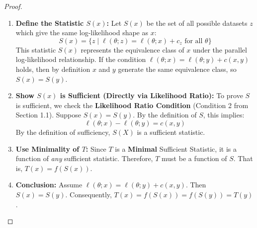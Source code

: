 \documentclass[
  letterpaper,
  DIV=11,
  numbers=noendperiod]{scrreprt}
\renewcommand{\[}{\begin{equation}}
\renewcommand{\]}{\end{equation}}
\theoremstyle{definition}
\theoremstyle{plain}
\theoremstyle{plain}
\theoremstyle{plain}
\theoremstyle{definition}
\theoremstyle{plain}
\theoremstyle{remark}
\begin{document}
\begin{proof}
\begin{enumerate}
\def\labelenumi{\arabic{enumi}.}
\item
  \textbf{Define the Statistic \(S(x)\):} Let \(S(x)\) be the set of all
  possible datasets \(z\) which give the same log-likelihood shape as
  \(x\): \[
  S(x) = \{z \mid \ell(\theta; z) = \ell(\theta; x) + c_z \text{ for all } \theta \}
  \] This statistic \(S(x)\) represents the equivalence class of \(x\)
  under the parallel log-likelihood relationship. If the condition
  \(\ell(\theta; x) = \ell(\theta; y) + c(x, y)\) holds, then by
  definition \(x\) and \(y\) generate the same equivalence class, so
  \(S(x) = S(y)\).
\item
  \textbf{Show \(S(x)\) is Sufficient (Directly via Likelihood Ratio):}
  To prove \(S\) is sufficient, we check the \textbf{Likelihood Ratio
  Condition} (Condition 2 from Section 1.1). Suppose \(S(x) = S(y)\). By
  the definition of \(S\), this implies: \[
  \ell(\theta; x) - \ell(\theta; y) = c(x, y)
  \] By the definition of sufficiency, \(S(X)\) is a sufficient
  statistic.
\item
  \textbf{Use Minimality of \(T\):} Since \(T\) is a \textbf{Minimal}
  Sufficient Statistic, it is a function of \emph{any} sufficient
  statistic. Therefore, \(T\) must be a function of \(S\). That is,
  \(T(x) = f(S(x))\).
\item
  \textbf{Conclusion:} Assume
  \(\ell(\theta; x) = \ell(\theta; y) + c(x, y)\). Then \(S(x) = S(y)\).
  Consequently, \(T(x) = f(S(x)) = f(S(y)) = T(y)\).
\end{enumerate}

\end{proof}
\end{document}
